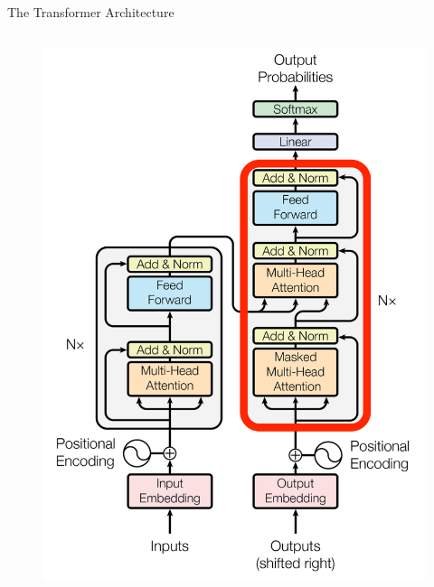 \documentclass[aspectratio=169]{beamer}
\begin{document}
\begin{frame}{The Transformer Architecture}
\begin{columns}
\begin{column}{0.5\textwidth}
\begin{center}
\begin{figure}
\begin{overprint}
    	 \includegraphics[height=\paperheight]{figures/transformer_decoder_block}

\end{overprint}
\end{figure}
\end{center}
\end{column}
\end{columns}
\end{frame}
\end{document}
